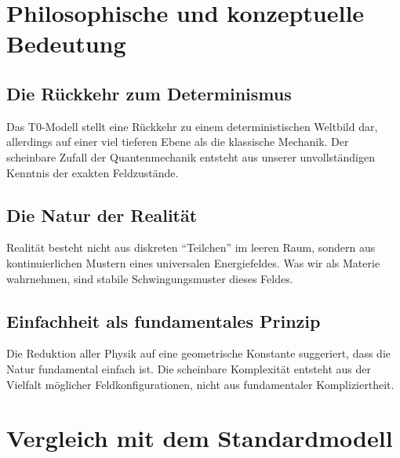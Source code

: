 	\section{Philosophische und konzeptuelle Bedeutung}
	
	\subsection{Die Rückkehr zum Determinismus}
	
	Das T0-Modell stellt eine Rückkehr zu einem deterministischen Weltbild dar, allerdings auf einer viel tieferen Ebene als die klassische Mechanik. Der scheinbare Zufall der Quantenmechanik entsteht aus unserer unvollständigen Kenntnis der exakten Feldzustände.
	
	\subsection{Die Natur der Realität}
	
	\begin{important}
		Realität besteht nicht aus diskreten ``Teilchen'' im leeren Raum, sondern aus kontinuierlichen Mustern eines universalen Energiefeldes. Was wir als Materie wahrnehmen, sind stabile Schwingungsmuster dieses Feldes.
	\end{important}
	
	\subsection{Einfachheit als fundamentales Prinzip}
	
	Die Reduktion aller Physik auf eine geometrische Konstante suggeriert, dass die Natur fundamental einfach ist. Die scheinbare Komplexität entsteht aus der Vielfalt möglicher Feldkonfigurationen, nicht aus fundamentaler Kompliziertheit.
	
	\section{Vergleich mit dem Standardmodell}
	
